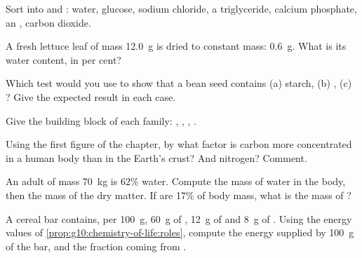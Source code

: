 \begin{exercise}[$\star$]\label{exo:g10:chemistry-of-life:2}
Sort into  and : water, glucose, sodium
chloride, a triglyceride, calcium phosphate, an , carbon
dioxide.
\end{exercise}

\begin{exercise}[$\star$]\label{exo:g10:chemistry-of-life:3}
A fresh lettuce leaf of mass \qty{12.0}{g} is dried to constant mass:
\qty{0.6}{g}. What is its water content, in per cent?
\end{exercise}

\begin{exercise}[$\star$]\label{exo:g10:chemistry-of-life:4}
Which test would you use to show that a bean seed contains (a) starch,
(b) , (c) ? Give the expected result in each case.
\end{exercise}

\begin{exercise}[$\star$]\label{exo:g10:chemistry-of-life:5}
Give the building block of each family: , ,
, .
\end{exercise}

\begin{exercise}[$\star\star$]\label{exo:g10:chemistry-of-life:6}
Using the first figure of the chapter, by what factor is carbon more
concentrated in a human body than in the Earth's crust? And nitrogen?
Comment.
\end{exercise}

\begin{exercise}[$\star\star$]\label{exo:g10:chemistry-of-life:7}
An adult of mass \qty{70}{kg} is 62\% water. Compute the mass of water
in the body, then the mass of the dry matter. If  are 17\% of
body mass, what is the mass of ?
\end{exercise}

\begin{exercise}[$\star\star$]\label{exo:g10:chemistry-of-life:8}
A cereal bar contains, per \qty{100}{g}, \qty{60}{g} of ,
\qty{12}{g} of  and \qty{8}{g} of . Using the energy
values of \cref{prop:g10:chemistry-of-life:roles}, compute the energy
supplied by \qty{100}{g} of the bar, and the fraction coming from
.
\end{exercise}

